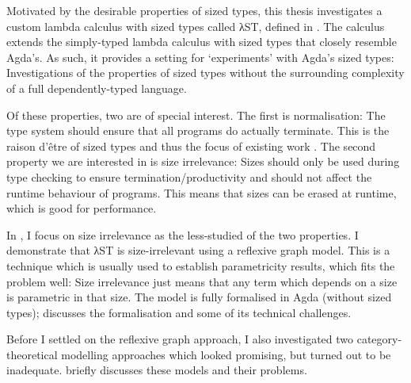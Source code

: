 Motivated by the desirable properties of sized types, this thesis investigates a
custom lambda calculus with sized types called λST, defined in .
The calculus extends the simply-typed lambda calculus with sized types that
closely resemble Agda's. As such, it provides a setting for
\enquote*{experiments} with Agda's sized types: Investigations of the properties
of sized types without the surrounding complexity of a full dependently-typed
language.

Of these properties, two are of special interest. The first is normalisation:
The type system should ensure that all programs do actually terminate. This is
the raison d'être of sized types and thus the focus of existing work . The
second property we are interested in is size irrelevance: Sizes should only be
used during type checking to ensure termination/productivity and should not
affect the runtime behaviour of programs. This means that sizes can be erased at
runtime, which is good for performance.

In , I focus on size irrelevance as the less-studied of the two
properties. I demonstrate that λST is size-irrelevant using a reflexive graph
model. This is a technique which is usually used to establish parametricity
results, which fits the problem well: Size irrelevance just means that any term
which depends on a size is parametric in that size. The model is fully
formalised in Agda (without sized types);  discusses the
formalisation and some of its technical challenges.

Before I settled on the reflexive graph approach, I also investigated two
category-theoretical modelling approaches which looked promising, but turned out
to be inadequate.  briefly discusses these models and their
problems.
